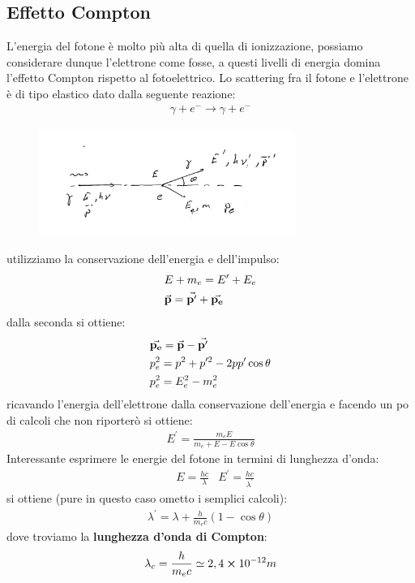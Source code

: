 \subsection{Effetto Compton}
L'energia del fotone è molto più alta di quella di ionizzazione, possiamo considerare dunque l'elettrone
come fosse, a questi livelli di energia domina l'effetto Compton rispetto al fotoelettrico.
Lo scattering fra il fotone e l'elettrone è di tipo elastico dato dalla seguente reazione:
\begin{align*}
    \gamma+e^{-} \rightarrow \gamma+e^{-}
\end{align*}
\begin{figure}[!h]
    \centering
    \includegraphics[scale=0.7]{ch6InterazioneMateria/Compton}
\end{figure}

utilizziamo la conservazione dell'energia e dell'impulso:
\begin{align*}
    &E+m_{e} = E^{\prime}+E_{e}\\
    &\va{p}=\va{p^{\prime}}+\va{p_{e}}
\end{align*}
dalla seconda si ottiene:
\begin{align*}
    &\va{p_{e}} =\va{p}-\va{p^{\prime}} \\
    &p_{e}^2 = p^2+p^{\prime2}-2pp^{\prime}\cos{\theta}\\
    &p_{e}^2 = E_{e}^2-m_{e}^2
\end{align*}
ricavando l'energia dell'elettrone dalla conservazione dell'energia e facendo un po di calcoli
che non riporterò si ottiene:
\begin{align*}
    E^{\prime} = \frac{m_{e}E}{m_{e}+E-E\cos{\theta}}
\end{align*}
Interessante esprimere le energie del fotone in termini di lunghezza d'onda:
\begin{align*}
    &E=\frac{hc}{\lambda} & E^{\prime} = \frac{hc}{\lambda^{\prime}}
\end{align*}
si ottiene (pure in questo caso ometto i semplici calcoli):
\begin{align*}
    \lambda^{\prime} = \lambda +\frac{h}{m_{e}c}(1-\cos{\theta})
\end{align*}
dove troviamo la \textbf{lunghezza d'onda di Compton}:
\begin{align*}
    \lambda_{c} = \frac{h}{m_{e}c}\simeq 2,4\cross10^{-12}m
\end{align*}
